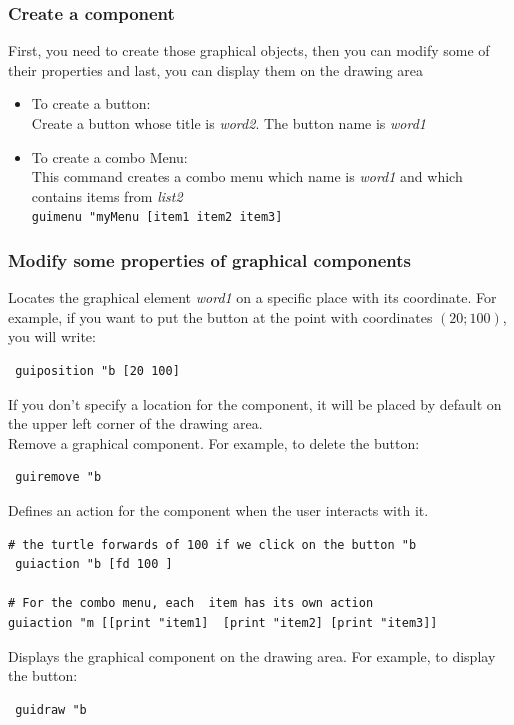 \subsubsection{Create a component}
First, you need to create those graphical objects, then you can modify some of their properties and last, you can display them on the drawing area
\begin{itemize}
 \item To create a button:\\
Create a button whose title is \textit{word2}. The button name is \textit{word1} \\
 \item To create a combo Menu:\\
This command creates a combo menu which name is \textit{word1} and which contains items from \textit{list2}\\
\texttt{guimenu "myMenu [item1 item2 item3]}
\end{itemize}
\subsubsection{Modify some properties of graphical components}
\noindent {} 
Locates the graphical element \textit{word1} on a specific place with its coordinate. For example, if you want to put the button at the point with coordinates $(20;100)$, you will write:\\
\begin{verbatim}
 guiposition "b [20 100]
\end{verbatim}
If you don't specify a location for the component, it will be placed by default on the upper left corner of the drawing area.\\
Remove a graphical component. For example, to delete the button:
\begin{verbatim}
 guiremove "b
\end{verbatim}
\noindent {}
Defines an action for the component when the user interacts with it.\\
\begin{verbatim}
# the turtle forwards of 100 if we click on the button "b
 guiaction "b [fd 100 ]

# For the combo menu, each  item has its own action
guiaction "m [[print "item1]  [print "item2] [print "item3]]
\end{verbatim}
\noindent {}
Displays the graphical component on the drawing area. For example, to display the button:\\
\begin{verbatim}
 guidraw "b
\end{verbatim}
